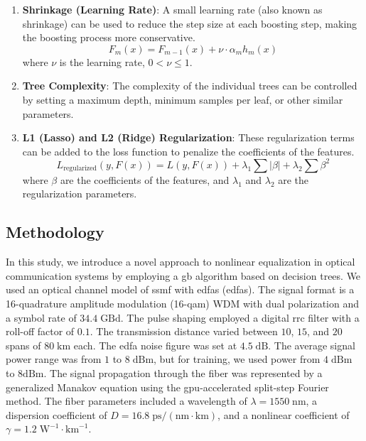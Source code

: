 \begin{enumerate}
    \item \textbf{Shrinkage (Learning Rate)}: 
    A small learning rate (also known as shrinkage) can be used to reduce the step size at each boosting step, making the boosting process more conservative.
    \[ F_m(x) = F_{m-1}(x) + \nu \cdot \alpha_m h_m(x) \]
    where \( \nu \) is the learning rate, \( 0 < \nu \leq 1 \).

    \item \textbf{Tree Complexity}:
    The complexity of the individual trees can be controlled by setting a maximum depth, minimum samples per leaf, or other similar parameters.

    \item \textbf{L1 (Lasso) and L2 (Ridge) Regularization}:
    These regularization terms can be added to the loss function to penalize the coefficients of the features.
    \[ L_{\text{regularized}}(y, F(x)) = L(y, F(x)) + \lambda_1 \sum | \beta | + \lambda_2 \sum \beta^2 \]
    where \( \beta \) are the coefficients of the features, and \( \lambda_1 \) and \( \lambda_2 \) are the regularization parameters.
\end{enumerate}


\subsection{Methodology}


In this study, we introduce a novel approach to nonlinear equalization in optical communication systems by employing a \acrshort{gb} algorithm based on decision trees.
We used an optical channel model of \acrfull{ssmf} with \acrlong{edfa}s (\acrshort{edfa}s). The signal format is a 16-quadrature amplitude modulation (16-\acrshort{qam}) WDM with dual polarization and a symbol rate of $34.4\;\textrm{GBd}$. The pulse shaping employed a digital \acrfull{rrc} filter with a roll-off factor of $0.1$. The transmission distance varied between $10$, $15$, and $20$ spans of $80\;\textrm{km}$ each. The \acrshort{edfa} noise figure was set at $4.5\;\textrm{dB}$. The average signal power range was from $1$ to $8\;\textrm{dBm}$, but for training, we used power from $4\;\textrm{dBm}$ to $8 \textrm{dBm}$. The signal propagation through the fiber was represented by a generalized Manakov equation using the \acrshort{gpu}-accelerated split-step Fourier method\cite{esf0_2023_7880552}. The fiber parameters included a wavelength of $\lambda = 1550\;\textrm{nm}$, a dispersion coefficient of $D = 16.8\;\textrm{ps}/(\textrm{nm} \cdot \textrm{km})$, and a nonlinear coefficient of $\gamma = 1.2\;\textrm{W}^{-1} \cdot \textrm{km}^{-1}$.



